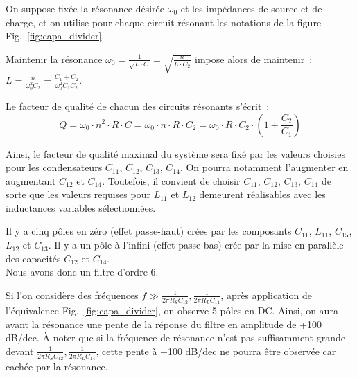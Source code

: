 \documentclass{article}
\begin{document}

On suppose fixée la résonance désirée $\omega_0$ et les impédances de source et de charge, et on utilise pour chaque circuit résonant les notations de la figure Fig.~\ref{fig:capa_divider}.

Maintenir la résonance ${\omega_0 = \frac{1}{\sqrt{L\cdot C}} = \sqrt{\frac{n}{L\cdot C_2}}}$ impose alors de maintenir~: ${L = \frac{n}{\omega_0^2 C_2} =\frac{C_1+C_2}{\omega_0^2 C_1 C_2}}$.


Le facteur de qualité de chacun des circuits résonants s'écrit~: 
\begin{equation*}
Q = \omega_0\cdot n^2\cdot R\cdot C = \omega_0\cdot n\cdot R\cdot C_2 = \omega_0\cdot R\cdot C_2\cdot (1+\frac{C_2}{C_1})
\end{equation*}

Ainsi, le facteur de qualité maximal du système sera fixé par les valeurs choisies pour les condensateurs $C_{11}$, $C_{12}$, $C_{13}$, $C_{14}$. On pourra notamment l'augmenter en augmentant $C_{12}$ et $C_{14}$. Toutefois, il convient de choisir $C_{11}$, $C_{12}$, $C_{13}$, $C_{14}$ de sorte que les valeurs requises pour $L_{11}$ et $L_{12}$ demeurent réalisables avec les inductances variables sélectionnées.






Il y a cinq pôles en zéro (effet passe-haut) crées par les composants $C_{11}$, $L_{11}$, $C_{15}$, $L_{12}$ et $C_{13}$. Il y a un pôle à l'infini (effet passe-bas) crée par la mise en parallèle des capacités $C_{12}$ et $C_{14}$.\\

Nous avons donc un filtre d'ordre 6.



Si l'on considère des fréquences ${f \gg \frac{1}{2\pi R_S C_{12}}, \frac{1}{2\pi R_L C_{14}}}$, après application de l'équivalence Fig.~\ref{fig:capa_divider}, on observe 5 pôles en DC. Ainsi, on aura avant la résonance une pente de la réponse du filtre en amplitude de +100 dB/dec. À noter que si la fréquence de résonance n'est pas suffisamment grande devant ${\frac{1}{2\pi R_S C_{12}}, \frac{1}{2\pi R_L C_{14}}}$, cette pente à +100 dB/dec ne pourra être observée car cachée par la résonance.
\end{document}
